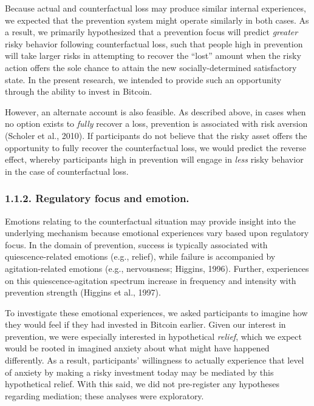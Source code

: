 \documentclass[man,floatsintext]{apa6}
\begin{document}
Because actual and counterfactual loss may produce similar internal experiences, we expected that the prevention system might operate similarly in both cases. As a result, we primarily hypothesized that a prevention focus will predict \emph{greater} risky behavior following counterfactual loss, such that people high in prevention will take larger risks in attempting to recover the \enquote{lost} amount when the risky action offers the sole chance to attain the new socially-determined satisfactory state. In the present research, we intended to provide such an opportunity through the ability to invest in Bitcoin.

However, an alternate account is also feasible. As described above, in cases when no option exists to \emph{fully} recover a loss, prevention is associated with risk aversion (Scholer et al., 2010). If participants do not believe that the risky asset offers the opportunity to fully recover the counterfactual loss, we would predict the reverse effect, whereby participants high in prevention will engage in \emph{less} risky behavior in the case of counterfactual loss.

\hypertarget{regulatory-focus-and-emotion.}{%
\subsubsection{1.1.2. Regulatory focus and emotion.}\label{regulatory-focus-and-emotion.}}

Emotions relating to the counterfactual situation may provide insight into the underlying mechanism because emotional experiences vary based upon regulatory focus. In the domain of prevention, success is typically associated with quiescence-related emotions (e.g., relief), while failure is accompanied by agitation-related emotions (e.g., nervousness; Higgins, 1996). Further, experiences on this quiescence-agitation spectrum increase in frequency and intensity with prevention strength (Higgins et al., 1997).

To investigate these emotional experiences, we asked participants to imagine how they would feel if they had invested in Bitcoin earlier. Given our interest in prevention, we were especially interested in hypothetical \emph{relief}, which we expect would be rooted in imagined anxiety about what might have happened differently. As a result, participants' willingness to actually experience that level of anxiety by making a risky investment today may be mediated by this hypothetical relief. With this said, we did not pre-register any hypotheses regarding mediation; these analyses were exploratory.
\end{document}
